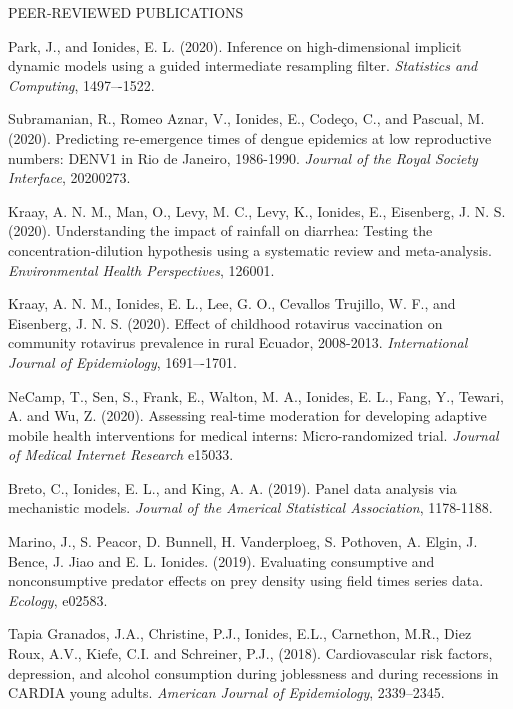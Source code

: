\begin{reflist}{PEER-REVIEWED PUBLICATIONS}
  \item Park, J., and Ionides, E. L. (2020). Inference on high-dimensional implicit dynamic models using a guided intermediate resampling filter. {\em Statistics and Computing}, {}{\separator}1497–-1522.

\item Subramanian, R., Romeo Aznar, V., Ionides, E., Code{\c c}o, C., and Pascual, M. (2020). Predicting re-emergence times of dengue epidemics at low reproductive numbers: DENV1 in Rio de Janeiro, 1986-1990. {\em Journal of the Royal Society Interface}, {}{\separator}20200273. 

\item Kraay, A. N. M., Man, O., Levy, M. C., Levy, K., Ionides, E., Eisenberg, J. N. S. (2020). Understanding the impact of rainfall on diarrhea: Testing the concentration-dilution hypothesis using a systematic review and meta-analysis. {\em Environmental Health Perspectives}, {}{\separator}126001.
  
\item Kraay, A. N. M., Ionides, E. L., Lee, G. O., Cevallos Trujillo, W. F., and Eisenberg, J. N. S. (2020). Effect of childhood rotavirus vaccination on community rotavirus prevalence in rural Ecuador, 2008-2013. {\em International Journal of Epidemiology}, {}{\separator}1691–-1701.
  
\item NeCamp, T., Sen, S., Frank, E., Walton, M. A., Ionides, E. L., Fang, Y., Tewari, A. and Wu, Z. (2020). Assessing real-time moderation for developing adaptive mobile health interventions for medical interns: Micro-randomized trial.
  {\it Journal of Medical Internet Research} {}{\separator}e15033.
  
\item Breto, C., Ionides, E. L., and King, A. A. (2019). Panel data analysis via mechanistic models. {\it Journal of the Americal Statistical Association}, {}{\separator}1178-1188.

\item Marino, J., S. Peacor, D. Bunnell, H. Vanderploeg, S. Pothoven, A. Elgin, J. Bence, J. Jiao and E. L. Ionides. (2019). Evaluating consumptive and nonconsumptive predator effects on prey density using field times series data. {\it Ecology}, {}{\separator}e02583.

\item Tapia Granados, J.A., Christine, P.J., Ionides, E.L., Carnethon, M.R., Diez Roux, A.V., Kiefe, C.I. and Schreiner, P.J., (2018). Cardiovascular risk factors, depression, and alcohol consumption during joblessness and during recessions in CARDIA young adults. 
  {\it American Journal of Epidemiology}, {}{\separator}2339--2345.


\end{reflist}
